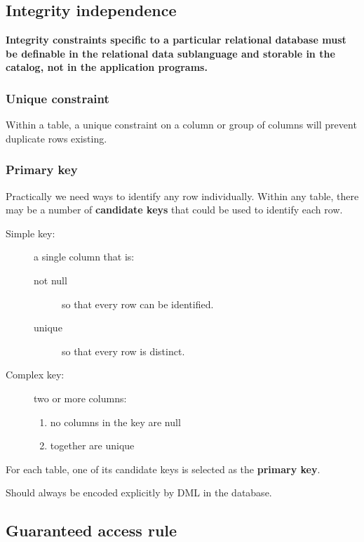 \documentclass[slides]{pgnotes}
\begin{document}
\subsection{Integrity independence}

\textbf{Integrity constraints specific to a particular relational database must be definable in the relational data sublanguage and storable in the catalog, not in the application programs.}

\subsubsection{Unique constraint}

Within a table, a unique constraint on a column or group of columns will prevent duplicate rows existing.  

\newpage

\subsubsection{Primary key}

Practically we need ways to identify any row individually.
Within any table, there may be a number of \textbf{candidate keys} that could be used to identify each row.
\begin{description}
\item[Simple key:] a single column that is:
  \begin{description}
  \item[not null] so that every row can be identified.
  \item[unique] so that every row is distinct. 
  \end{description}
\item[Complex key:] two or more columns:
  \begin{enumerate}
  \item no columns in the key are null
  \item together are unique
  \end{enumerate}
\end{description}
For each table, one of its candidate keys is selected as the \textbf{primary key}.

Should always be encoded explicitly by DML in the database.


\subsection{Guaranteed access rule}
\end{document}
